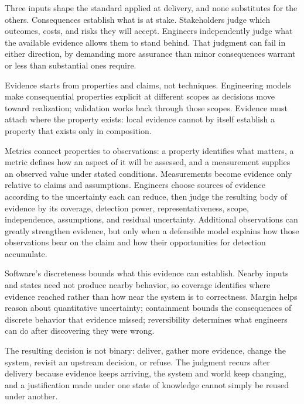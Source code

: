 Three inputs shape the standard applied at delivery, and none substitutes for the others.
Consequences establish what is at stake. Stakeholders judge which outcomes, costs, and risks they
will accept. Engineers independently judge what the available evidence allows them to stand behind.
That judgment can fail in either direction, by demanding more assurance than minor consequences
warrant or less than substantial ones require.

Evidence starts from properties and claims, not techniques. Engineering models make consequential
properties explicit at different scopes as decisions move toward realization; validation works back
through those scopes. Evidence must attach where the property exists: local evidence cannot by
itself establish a property that exists only in composition.

Metrics connect properties to observations: a property identifies what matters, a metric defines
how an aspect of it will be assessed, and a measurement supplies an observed value under stated
conditions. Measurements become evidence only relative to claims and assumptions. Engineers choose
sources of evidence according to the uncertainty each can reduce, then judge the resulting body of
evidence by its coverage, detection power, representativeness, scope, independence, assumptions,
and residual uncertainty. Additional observations can greatly strengthen evidence, but only when a
defensible model explains how those observations bear on the claim and how their opportunities for
detection accumulate.

Software's discreteness bounds what this evidence can establish. Nearby inputs and states need not
produce nearby behavior, so coverage identifies where evidence reached rather than how near the
system is to correctness. Margin helps reason about quantitative uncertainty; containment bounds
the consequences of discrete behavior that evidence missed; reversibility determines what engineers
can do after discovering they were wrong.

The resulting decision is not binary: deliver, gather more evidence, change the system, revisit an
upstream decision, or refuse. The judgment recurs after delivery because evidence keeps arriving,
the system and world keep changing, and a justification made under one state of knowledge cannot
simply be reused under another.

